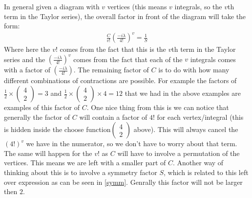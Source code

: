 \documentclass[11pt]{article}
\numberwithin{equation}{section}
\begin{document}
\begin{itemize}
In general given a diagram  with $v$ vertices (this means $v$ integrals, so the $v$th term in the Taylor series), the overall factor in front of the diagram will take the form:
\begin{align}
\label{symm}
   \frac{C}{v!}\left(\frac{-i\lambda}{4!}\right)^v = \frac{1}{S}
 \end{align}
 Where here the $v!$ comes from the fact that this is the  $v$th term in the Taylor series and the $\left(\frac{-i\lambda}{4!}\right)^v$ comes from the fact that each of the $v$ integrals comes with a factor of $\left(\frac{-i\lambda}{4!}\right)$. The remaining factor of $C$ is to do with how many different combinations of contractions are possible. For example the factors of $\frac{1}{2} \times \begin{pmatrix}
    4 \\ 2
  \end{pmatrix} = 3$ and $\frac{1}{2} \times \begin{pmatrix}
    4 \\ 2
  \end{pmatrix} \times 4 = 12$ that we had in the above examples are examples of this factor of $C$. One nice thing from this is we can notice that generally the factor of $C$ will contain a factor of $4!$ for each vertex/integral (this is hidden inside the choose function$\begin{pmatrix}
    4 \\ 2
  \end{pmatrix}$ above). This will always cancel the $(4!)^v$ we have in the numerator, so we don't have to worry about that term. The same will happen for the $v!$ as $C$ will have to involve a permutation of the vertices. This means we are left with a smaller part of $C$. Another way of thinking about this is to involve a symmetry factor $S$, which is related to this left over expression as can be seen in \ref{symm}. Genrally this factor will not be larger then $2$.  
\end{itemize}
\end{document}
